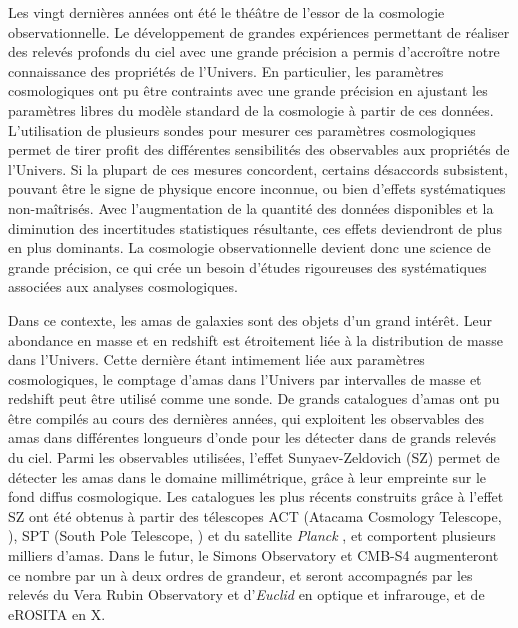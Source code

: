 
Les vingt dernières années ont été le théâtre de l'essor de la cosmologie observationnelle.
Le développement de grandes expériences permettant de réaliser des relevés profonds du ciel avec une grande précision a permis d'accroître notre connaissance des propriétés de l'Univers.
En particulier, les paramètres cosmologiques ont pu être contraints avec une grande précision en ajustant les paramètres libres du modèle standard de la cosmologie à partir de ces données.
L'utilisation de plusieurs sondes pour mesurer ces paramètres cosmologiques permet de tirer profit des différentes sensibilités des observables aux propriétés de l'Univers.
Si la plupart de ces mesures concordent, certains désaccords subsistent, pouvant être le signe de physique encore inconnue, ou bien d'effets systématiques non-maîtrisés.
Avec l'augmentation de la quantité des données disponibles et la diminution des incertitudes statistiques résultante, ces effets deviendront de plus en plus dominants.
La cosmologie observationnelle devient donc une science de grande précision, ce qui crée un besoin d'études rigoureuses des systématiques associées aux analyses cosmologiques.

Dans ce contexte, les amas de galaxies sont des objets d'un grand intérêt.
Leur abondance en masse et en redshift est étroitement liée à la distribution de masse dans l'Univers.
Cette dernière étant intimement liée aux paramètres cosmologiques, le comptage d'amas dans l'Univers par intervalles de masse et redshift peut être utilisé comme une sonde.
De grands catalogues d'amas ont pu être compilés au cours des dernières années, qui exploitent les observables des amas dans différentes longueurs d'onde pour les détecter dans de grands relevés du ciel.
Parmi les observables utilisées, l'effet Sunyaev-Zeldovich (SZ) permet de détecter les amas dans le domaine millimétrique, grâce à leur empreinte sur le fond diffus cosmologique.
Les catalogues les plus récents construits grâce à l'effet SZ ont été obtenus à partir des télescopes ACT (Atacama Cosmology Telescope, \cite{hilton_atacama_2021}), SPT (South Pole Telescope, \cite{bleem_galaxy_2015,bleem_sptpol_2020}) et du satellite \textit{Planck} \cite{planck_collaboration_planck_2016-3}, et comportent plusieurs milliers d'amas.
Dans le futur, le Simons Observatory \cite{ade_simons_2019} et CMB-S4 \cite{abazajian_cmb-s4_2016} augmenteront ce nombre par un à deux ordres de grandeur, et seront accompagnés par les relevés du Vera Rubin Observatory \cite{lsst_dark_energy_science_collaboration_large_2012} et d'\textit{Euclid} \cite{sartoris_next_2016} en optique et infrarouge, et de eROSITA \cite{pillepich_forecasts_2018} en X.

